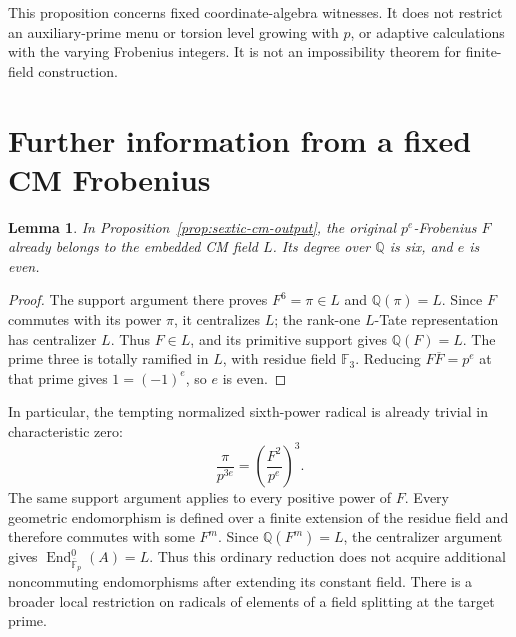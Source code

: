 \documentclass[11pt]{article}
\newtheorem{lemma}[theorem]{Lemma}
\theoremstyle{definition}
\theoremstyle{remark}
\begin{document}
This proposition concerns fixed coordinate-algebra witnesses.
It does not restrict an auxiliary-prime menu or torsion level
growing with \(p\), or adaptive calculations with the varying
Frobenius integers. It is not an impossibility theorem for
finite-field construction.


\section{Further information from a fixed CM Frobenius}
\label{sec:kummer-fixed-frobenius}

\begin{lemma}\label{lem:kummer-unpowered-cm-frobenius}
In Proposition~\ref{prop:sextic-cm-output}, the original
\(p^e\)-Frobenius \(F\) already belongs to the embedded
CM field \(L\). Its degree over \(\mathbb Q\) is six,
and \(e\) is even.
\end{lemma}
\begin{proof}
The support argument there proves \(F^6=\pi\in L\) and
\(\mathbb Q(\pi)=L\). Since \(F\) commutes with its
power \(\pi\), it centralizes \(L\); the rank-one
\(L\)-Tate representation has centralizer \(L\).
Thus \(F\in L\), and its primitive support gives
\(\mathbb Q(F)=L\). The prime three is totally ramified
in \(L\), with residue field \(\mathbb F_3\).
Reducing \(F\overline F=p^e\) at that prime gives
\(1=(-1)^e\), so \(e\) is even.
\end{proof}

In particular, the tempting normalized sixth-power radical is
already trivial in characteristic zero:
\[
 \frac{\pi}{p^{3e}}=\left(\frac{F^2}{p^e}\right)^3.
\]
The same support argument applies to every positive power of \(F\).
Every geometric endomorphism is defined over a finite extension of
the residue field and therefore commutes with some \(F^m\).
Since \(\mathbb Q(F^m)=L\), the centralizer argument gives
\(\operatorname{End}^0_{\overline{\mathbb F}_p}(A)=L\).
Thus this ordinary reduction does not acquire additional
noncommuting endomorphisms after extending its constant field.
There is a broader local restriction on radicals of elements
of a field splitting at the target prime.
\end{document}
